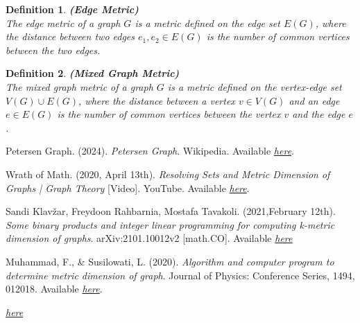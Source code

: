\documentclass[12pt]{amsart}
\theoremstyle{plain}
\newtheorem*{definition}{Definition}
\begin{document}
\newpage

\begin{definition} \textbf{(Edge Metric)} \\
  The \textit{edge metric} of a graph $G$ is a metric defined on the edge set $E(G)$, where the distance between two edges $e_1, e_2 \in E(G)$ is the number of common vertices between the two edges.
\end{definition}

\begin{definition} \textbf{(Mixed Graph Metric)} \\
  The \textit{mixed graph metric} of a graph $G$ is a metric defined on the vertex-edge set $V(G) \cup E(G)$, where the distance between a vertex $v \in V(G)$ and an edge $e \in E(G)$ is the number of common vertices between the vertex $v$ and the edge $e$.
\end{definition}

\newpage

\begin{thebibliography}{9}

  Petersen Graph. (2024). \textit{Petersen Graph}. Wikipedia. Available \href{https://en.wikipedia.org/wiki/Petersen_graph}{\textit{here}}.

  Wrath of Math. (2020, April 13th). \textit{Resolving Sets and Metric Dimension of Graphs | Graph Theory} [Video]. YouTube. Available \href{https://www.youtube.com/watch?v=ESgQnbHTj7c}{\textit{here}}.

  Sandi Klavžar, Freydoon Rahbarnia, Mostafa Tavakoli. (2021,February 12th). \textit{Some binary products and integer linear programming for computing k-metric dimension of graphs}. arXiv:2101.10012v2 [math.CO]. Available
  \href{https://users.fmf.uni-lj.si/klavzar/preprints/2101.10012v2.pdf}{\textit{here}}

  Muhammad, F., \& Susilowati, L. (2020). \textit{Algorithm and computer program to determine metric dimension of graph}. Journal of Physics: Conference Series, 1494, 012018. Available \href{https://iopscience.iop.org/article/10.1088/1742-6596/1494/1/012018}{\textit{here}}.

  \href{https://users.fmf.uni-lj.si/klavzar/preprints/emd(Mar\%209\%202020)-submit.pdf}{\textit{here}}

\end{thebibliography}
\end{document}

